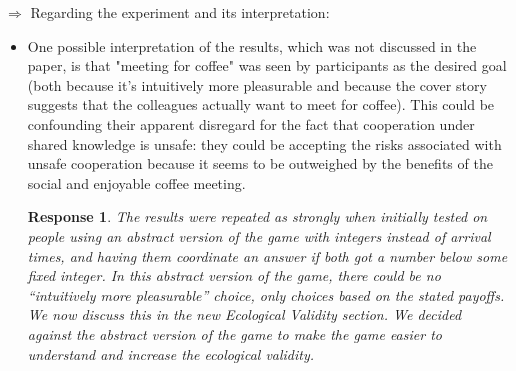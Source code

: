 \documentclass[a4paper]{article}
\newtheorem{response}{Response}
\newenvironment{tobo}{\smallskip \noindent \color{yellow!80!black!80}}{\color{black}\smallskip}
\begin{document}
$\Rightarrow$ Regarding the experiment and its interpretation:
\begin{itemize}
  \item One possible interpretation of the results, which was not discussed in the paper, is that "meeting for coffee" was seen by participants as the desired goal (both because it's intuitively more pleasurable and because the cover story suggests that the colleagues actually want to meet for coffee). This could be confounding their apparent disregard for the fact that cooperation under shared knowledge is unsafe: they could be accepting the risks associated with unsafe cooperation because it seems to be outweighed by the benefits of the social and enjoyable coffee meeting. 

 \begin{response}\label{canteenpref2}
The results were repeated as strongly when initially tested on people using an abstract version of the game with integers instead of arrival times, and having them coordinate an answer if both got a number below some fixed integer. In this abstract version of the game, there could be no ``intuitively more pleasurable'' choice, only choices based on the stated payoffs. We now discuss this in the new Ecological Validity section. We decided against the abstract version of the game to make the game easier to understand and increase the ecological validity. 

\end{response}
\end{itemize}
\end{document}
